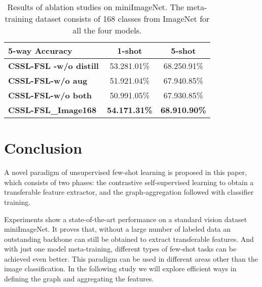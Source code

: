 \documentclass[conference]{IEEEtran}
\begin{document}
\begin{table}[htbp]
\caption{Results of ablation studies on miniImageNet. The meta-training dataset consists of 168 classes from ImageNet for all the four models.}
\begin{center}
\begin{tabular}{l c c}
\hline
\textbf{5-way Accuracy}&\textbf{1-shot}&\textbf{5-shot} \\
\hline
\textbf{CSSL-FSL -w/o distill} &53.281.01\% &68.250.91\% \\
\textbf{CSSL-FSL-w/o aug} &51.921.04\%	&67.940.85\% \\
\textbf{CSSL-FSL-w/o both}	&50.991.05\%	&67.930.85\% \\
\textbf{CSSL-FSL\_Image168}	&\textbf{54.171.31\%}	&\textbf{68.910.90\%} \\
\hline
\end{tabular}
\label{tab3}
\end{center}
\end{table}


\section{Conclusion}\label{Section 5}
A novel paradigm of unsupervised few-shot learning is proposed in this paper, which consists of two phases: the contrastive self-supervised learning to obtain a transferable feature extractor, and the graph-aggregation followed with classifier training.


Experiments show a state-of-the-art performance on a standard vision dataset miniImageNet. It proves that, without a large number of labeled data an outstanding backbone can still be obtained to extract transferable features. And with just one model meta-training, different types of few-shot tasks can be achieved even better. This paradigm can be used in different areas other than the image classification. In the following study we will explore efficient ways in defining the graph and aggregating the features.











\vspace{12pt}
\end{document}
